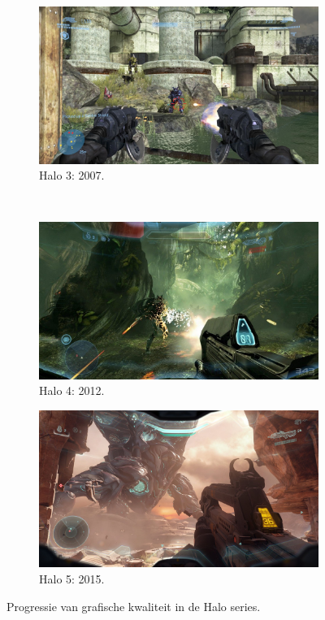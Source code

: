 \begin{figure}[t]
\begin{subfigure}[b]{0.356\textwidth}
    \includegraphics[width=\textwidth]{./img/raw/intro-halo/halo_3.png}
    \caption{Halo 3: 2007.}
    \label{fig:intro-halo:3}
  \end{subfigure}\\
  \begin{subfigure}[b]{0.45\textwidth}
    \includegraphics[width=\textwidth]{./img/raw/intro-halo/halo_4.jpg}
    \caption{Halo 4: 2012.}
    \label{fig:intro-halo:4}
  \end{subfigure} \quad
  \begin{subfigure}[b]{0.45\textwidth}
    \includegraphics[width=\textwidth]{./img/raw/intro-halo/halo_5.jpg}
    \caption{Halo 5: 2015.}
    \label{fig:intro-halo:5}
  \end{subfigure}
  \caption{Progressie van grafische kwaliteit in de Halo series\cite{bungie2001studios}.}
  \label{fig:intro-halo}
\end{figure}
